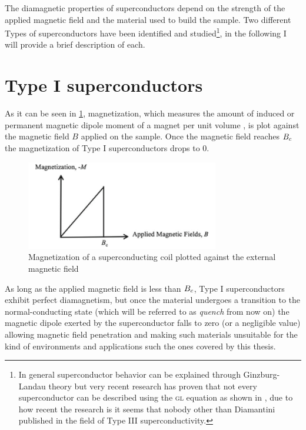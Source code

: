 The diamagnetic properties of superconductors depend on the strength of the applied magnetic field
and the material used to build the sample. Two different Types of superconductors have been
identified and studied\footnote{In general superconductor behavior can be explained through
	Ginzburg-Landau theory \cite{Cyrot1973} but very recent research has proven that not every
	superconductor can be described using the \textsc{gl} equation as shown in
	\cite{diamantini2023typeiiisuperconductivity}, due to how recent the research is it seems
	that nobody other than Diamantini published in the field of Type III superconductivity.}, in the following I will provide a brief description of each.

\section{Type I superconductors}
\label{sec:type1}
As it can be seen in \cref{img:type1-transition}, magnetization, which measures the amount of induced or
permanent magnetic dipole moment of a magnet per unit volume \cite{polarization-magnetization}, is
plot against the magnetic field $B$ applied on the sample. Once the magnetic field reaches $B_c$ the
magnetization of Type I superconductors drops to $0$.
\begin{figure}
	\centering
	\includegraphics[width=0.75\textwidth]{./img/type1.png}
	\caption{Magnetization of a superconducting coil plotted against the external magnetic field
		\cite{slimani2022superconducting}}
	\label{img:type1-transition}
\end{figure}
As long as the applied magnetic field is less than $B_c$, Type I superconductors exhibit perfect
diamagnetism, but once the material undergoes a transition to the normal-conducting
state (which will be referred to as \emph{quench} from now on) the magnetic dipole exerted by the
superconductor falls to zero (or a negligible value) allowing magnetic field penetration and making such materials unsuitable for the kind of environments and applications such the ones covered by this thesis.

